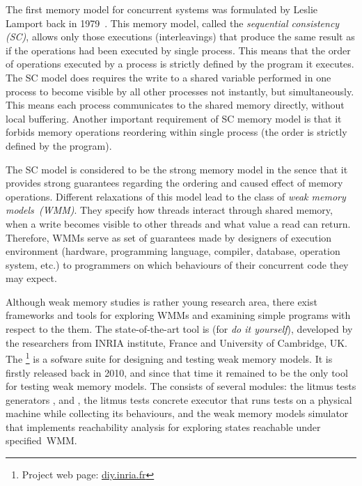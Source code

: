 
The first memory model for concurrent systems was formulated by Leslie Lamport back in 1979~\cite{lamport1979make}. This memory model, called the \textit{sequential consistency (SC)}, allows only those executions (interleavings) that produce the same result as if the operations had been executed by single process. This means that the order of operations executed by a process is strictly defined by the program it executes. The SC model does requires the write to a shared variable performed in one process to become visible by all other processes not instantly, but simultaneously. This means each process communicates to the shared memory directly, without local buffering. Another important requirement of SC memory model is that it forbids memory operations reordering within single process (the order is strictly defined by the program).

The SC model is considered to be the strong memory model in the sence that it provides strong guarantees regarding the ordering and caused effect of memory operations. Different relaxations of this model lead to the class of \textit{weak memory models~(WMM)}.
They specify how threads interact through shared memory, when a write becomes visible to other threads and what value a read can return. 
Therefore, WMMs serve as set of guarantees made by designers of execution environment (hardware, programming language, compiler, database, operation system, etc.) to programmers on which behaviours of their concurrent code they may expect. 

Although weak memory studies is rather young research area, there exist frameworks and tools for exploring WMMs and examining simple programs with respect to the them. The state-of-the-art tool is  (for \textit{do it yourself}), developed by the researchers from INRIA institute, France and University of Cambridge, UK.
The \footnote{Project web page: \url{diy.inria.fr}} is a sofware suite for designing and testing weak memory models. It is firstly released back in 2010, and since that time it remained to be the only tool for testing weak memory models. The  consists of several modules: the litmus tests generators ,  and , the litmus tests concrete executor  that runs tests on a physical machine while collecting its behaviours, and the weak memory models simulator  that implements reachability analysis for exploring states reachable under specified~WMM.

